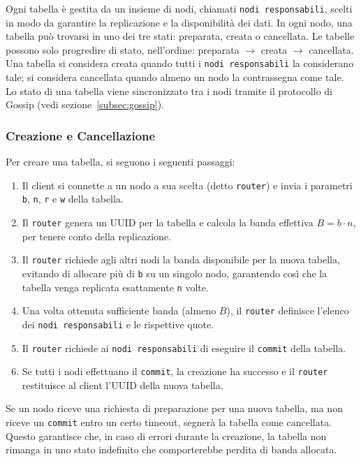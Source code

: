 Ogni tabella è gestita da un insieme di nodi, chiamati \texttt{nodi responsabili}, scelti in modo da garantire la replicazione e la disponibilità dei dati.
In ogni nodo, una tabella può trovarsi in uno dei tre stati: preparata, creata o cancellata.
Le tabelle possono solo progredire di stato, nell'ordine: preparata $\rightarrow$ creata $\rightarrow$ cancellata.
Una tabella si considera creata quando tutti i \texttt{nodi responsabili} la considerano tale; si considera cancellata quando almeno un nodo la contrassegna come tale.
Lo stato di una tabella viene sincronizzato tra i nodi tramite il protocollo di Gossip (vedi sezione~\ref{subsec:gossip}).

\subsubsection{Creazione e Cancellazione}
\label{subsubsec:creazione-cancellazione}

Per creare una tabella, si seguono i seguenti passaggi:
\begin{enumerate}
    \item Il client si connette a un nodo a sua scelta (detto \texttt{router}) e invia i parametri \texttt{b}, \texttt{n}, \texttt{r} e \texttt{w} della tabella.
    \item Il \texttt{router} genera un UUID per la tabella e calcola la banda effettiva $B = b \cdot n$, per tenere conto della replicazione.
    \item Il \texttt{router} richiede agli altri nodi la banda disponibile per la nuova tabella, evitando di allocare più di \texttt{b} su un singolo nodo, garantendo così che la tabella venga replicata esattamente \texttt{n} volte.
    \item Una volta ottenuta sufficiente banda (almeno $B$), il \texttt{router} definisce l'elenco dei \texttt{nodi responsabili} e le rispettive quote.
    \item Il \texttt{router} richiede ai \texttt{nodi responsabili} di eseguire il \texttt{commit} della tabella.
    \item Se tutti i nodi effettuano il \texttt{commit}, la creazione ha successo e il \texttt{router} restituisce al client l'UUID della nuova tabella.
\end{enumerate}


Se un nodo riceve una richiesta di preparazione per una nuova tabella, ma non riceve un \texttt{commit} entro un certo timeout, segnerà la tabella come cancellata.
Questo garantisce che, in caso di errori durante la creazione, la tabella non rimanga in uno stato indefinito che comporterebbe perdita di banda allocata.

